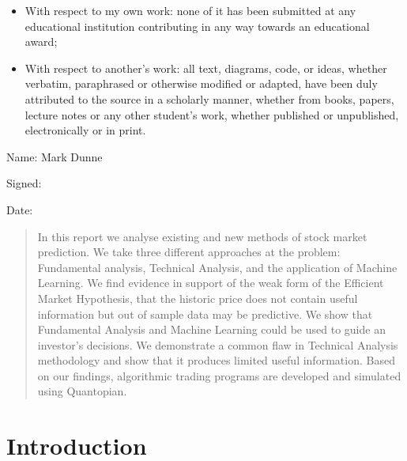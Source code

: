 \documentclass{report}
\begin{document}
\begin{titlepage}
\begin{itemize}
  \item With respect to my own work: none of it has been submitted at any educational institution contributing in any way towards an educational award;

  \item With respect to another’s work: all text, diagrams, code, or ideas, whether verbatim, paraphrased or otherwise modified or adapted, have been duly attributed to the source in a scholarly manner, whether from books, papers, lecture notes or any other student’s work, whether published or unpublished, electronically or in print. 
  
\end{itemize}


\vspace{20pt}

{ \large Name: Mark Dunne }

\vspace{20pt}

{ \large Signed: }
	
\vspace{20pt}

{ \large Date: }  


\end{titlepage}

\begin{abstract}

In this report we analyse existing and new methods of stock market prediction. We take three different approaches at the problem: Fundamental analysis, Technical Analysis, and the application of Machine Learning. We find evidence in support of the weak form of the Efficient Market Hypothesis, that the historic price does not contain useful information but out of sample data may be predictive. We show that Fundamental Analysis and Machine Learning could be used to guide an investor's decisions. We demonstrate a common flaw in Technical Analysis methodology and show that it produces limited useful information. Based on our findings, algorithmic trading programs are developed and simulated using Quantopian.

\end{abstract}

\tableofcontents

\chapter{Introduction}
\end{document}
